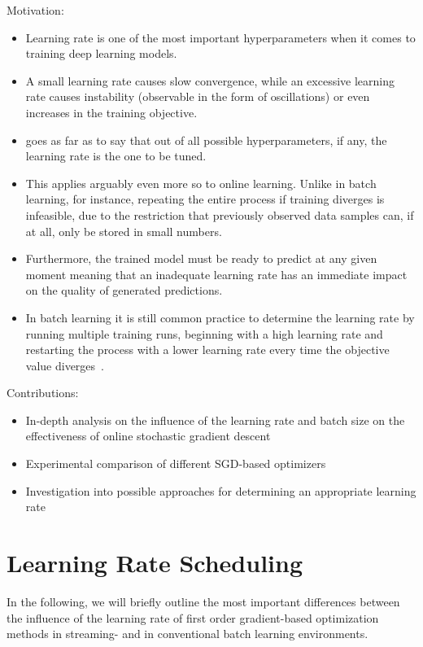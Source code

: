 \documentclass[letterpaper]{article} %
\begin{document}
Motivation:
\begin{itemize}
	\item Learning rate is one of the most important hyperparameters when it comes to training deep learning models.
	\item A small learning rate causes slow convergence, while an excessive learning rate causes instability (observable in the form of oscillations) or even increases in the training objective.
	\item \citet{bengioPracticalRecommendationsGradientbased2012} goes as far as to say that out of all possible hyperparameters, if any, the learning rate is the one to be tuned.
	\item This applies arguably even more so to online learning. Unlike in batch learning, for instance, repeating the entire process if training diverges is infeasible, due to the restriction that previously observed data samples can, if at all, only be stored in small numbers.
	\item Furthermore, the trained model must be ready to predict at any given moment meaning that an inadequate learning rate has an immediate impact on the quality of generated predictions.
	\item In batch learning it is still common practice to determine the learning rate by running multiple training runs, beginning with a high learning rate and restarting the process with a lower learning rate every time the objective value diverges~\cite{bengioPracticalRecommendationsGradientbased2012}.
\end{itemize}

Contributions:
\begin{itemize}
	\item In-depth analysis on the influence of the learning rate and batch size on the effectiveness of online stochastic gradient descent
	\item Experimental comparison of different SGD-based optimizers
	\item Investigation into possible approaches for determining an appropriate learning rate
\end{itemize}

\section{Learning Rate Scheduling}

In the following, we will briefly outline the most important differences between the influence of the learning rate of first order gradient-based optimization methods in streaming- and in conventional batch learning environments.
\end{document}

